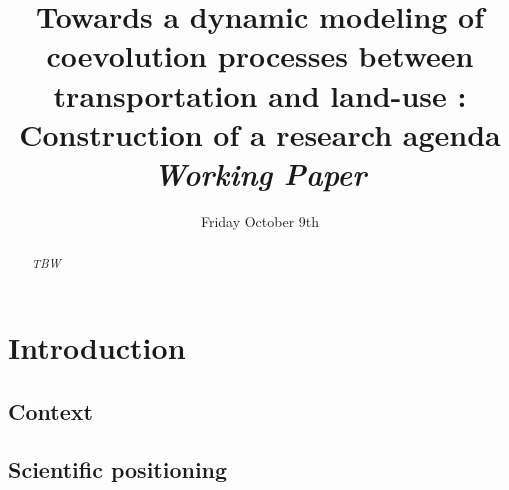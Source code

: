 


\title{Towards a dynamic modeling of coevolution processes between transportation and land-use : Construction of a research agenda\bigskip\\
\textit{Working Paper}
}
\author{}
\date{Friday October 9th}


\maketitle

\justify


\begin{abstract}
\textit{TBW}
\end{abstract}


\section{Introduction}


\subsection{Context}




\subsection{Scientific positioning}


